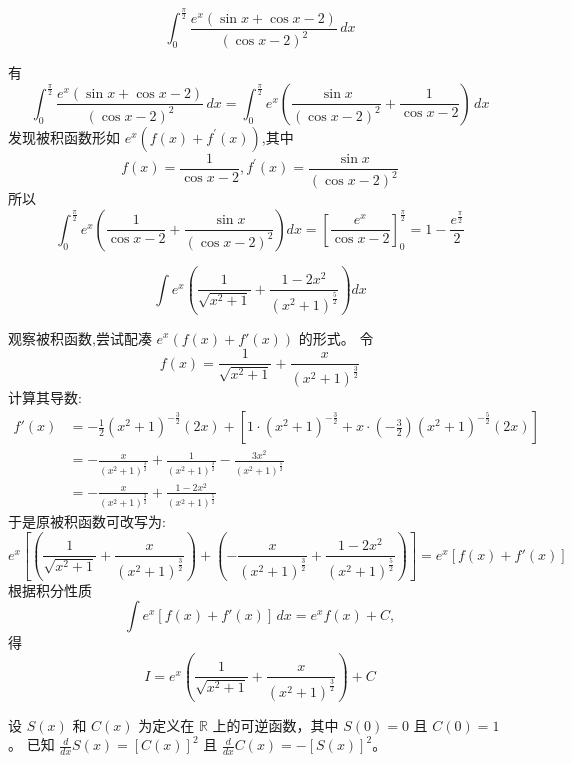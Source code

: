 \begin{questions}
    \question 
    \[
    \int_0^{\frac{\pi}{2}} \frac{e^x(\sin x + \cos x - 2)}{(\cos x - 2)^2} \, dx
    \]
    \begin{solution}
        有\[\int_0^{\frac{\pi}{2}} \frac{e^x(\sin x + \cos x - 2)}{(\cos x - 2)^2} \, dx 
        =\int_0^{\frac{\pi}{2}}e^{x}\left(\frac{\sin x}{(\cos x-2)^{2}}+\frac{1}{\cos x-2}\right) \, dx 
        \]
        发现被积函数形如 \(e^{x}(f(x)+f^{\prime }(x))\),其中\[
        f(x)= \frac{1}{\cos x-2}, f^{\prime }(x)=\frac{\sin x}{(\cos x-2)^{2}}
        \]
        所以\[
        \int _{0}^{\frac{\pi }{2}}e^{x}\left(\frac{1}{\cos x-2}+\frac{\sin x}{(\cos x-2)^{2}}\right)dx=\left[\frac{e^{x}}{\cos x-2}\right]_{0}^{\frac{\pi }{2}}=1 - \frac{e^{\frac{\pi}{2}}}{2}
        \]
    \end{solution}

    \question
    \[
    \int e^x \left( \frac{1}{\sqrt{x^2+1}} + \frac{1-2x^2}{(x^2+1)^{\frac{5}{2}}} \right) dx
    \]
    \begin{solution}
        观察被积函数,尝试配凑 $e^x(f(x) + f'(x))$ 的形式。
        令 
        \[
        f(x) = \frac{1}{\sqrt{x^2+1}} + \frac{x}{(x^2+1)^{\frac{3}{2}}}
        \]
        计算其导数:
        \begin{align*}
        f'(x) &= -\frac{1}{2}(x^2+1)^{-\frac{3}{2}}(2x) + \left[ 1 \cdot (x^2+1)^{-\frac{3}{2}} + x \cdot \left(-\frac{3}{2}\right)(x^2+1)^{-\frac{5}{2}}(2x) \right] \\
        &= -\frac{x}{(x^2+1)^{\frac{3}{2}}} + \frac{1}{(x^2+1)^{\frac{3}{2}}} - \frac{3x^2}{(x^2+1)^{\frac{5}{2}}} \\
        &= -\frac{x}{(x^2+1)^{\frac{3}{2}}} + \frac{1-2x^2}{(x^2+1)^{\frac{5}{2}}}
        \end{align*}
        于是原被积函数可改写为:
        \[
        e^x \left[ \left( \frac{1}{\sqrt{x^2+1}} + \frac{x}{(x^2+1)^{\frac{3}{2}}} \right) + \left( -\frac{x}{(x^2+1)^{\frac{3}{2}}} + \frac{1-2x^2}{(x^2+1)^{\frac{5}{2}}} \right) \right] = e^x [f(x) + f'(x)]
        \]
        根据积分性质 
        \[
        \int e^x [f(x) + f'(x)] \, dx = e^x f(x) + C,
        \]
        得
        \[
        I = e^x \left( \frac{1}{\sqrt{x^2+1}} + \frac{x}{(x^2+1)^{\frac{3}{2}}} \right) + C
        \]
    \end{solution}

    \question
设 $S(x)$ 和 $C(x)$ 为定义在 $\mathbb{R}$ 上的可逆函数，其中 $S(0) = 0$ 且 $C(0) = 1$。
已知 $\frac{d}{dx} S(x) = [C(x)]^2$ 且 $\frac{d}{dx} C(x) = -[S(x)]^2$。
\begin{parts}

\end{parts}
\end{questions}
